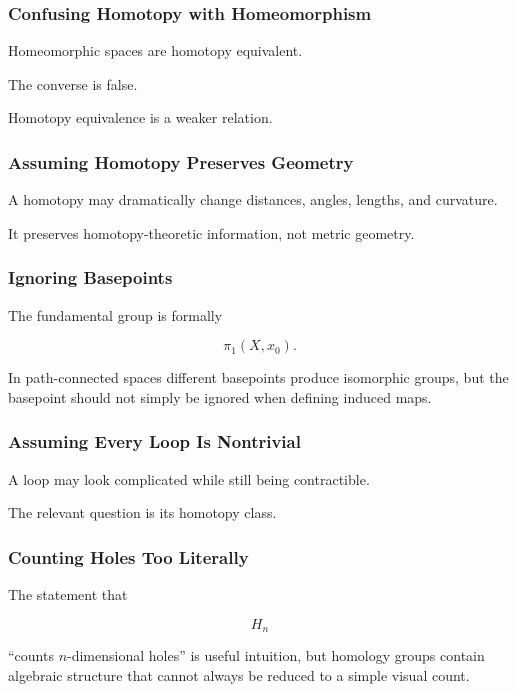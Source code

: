 \subsubsection{Confusing Homotopy with Homeomorphism}

Homeomorphic spaces are homotopy equivalent.

The converse is false.

Homotopy equivalence is a weaker relation.

\subsubsection{Assuming Homotopy Preserves Geometry}

A homotopy may dramatically change distances, angles, lengths, and
curvature.

It preserves homotopy-theoretic information, not metric geometry.

\subsubsection{Ignoring Basepoints}

The fundamental group is formally

\[
\pi_1(X,x_0).
\]

In path-connected spaces different basepoints produce isomorphic groups, but
the basepoint should not simply be ignored when defining induced maps.

\subsubsection{Assuming Every Loop Is Nontrivial}

A loop may look complicated while still being contractible.

The relevant question is its homotopy class.

\subsubsection{Counting Holes Too Literally}

The statement that

\[
H_n
\]

``counts \(n\)-dimensional holes'' is useful intuition, but homology groups
contain algebraic structure that cannot always be reduced to a simple visual
count.

